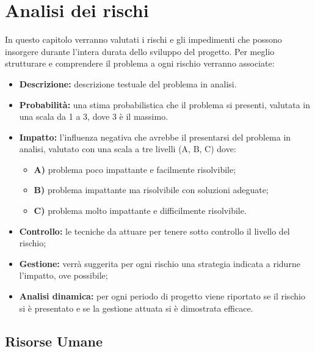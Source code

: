 \documentclass[a4paper,11pt]{article}
\begin{document}
	\section{Analisi dei rischi}
	In questo capitolo verranno valutati i rischi e gli impedimenti che possono insorgere durante l'intera durata dello sviluppo del progetto. Per meglio strutturare e comprendere il problema a ogni rischio verranno associate:
	\begin{itemize}
	\item \textbf{Descrizione:} descrizione testuale del problema in analisi.
	\item \textbf{Probabilità:} una stima probabilistica che il problema si presenti, valutata in una scala da 1 a 3, dove 3 è il massimo.
	\item \textbf{Impatto:} l'influenza negativa che avrebbe il presentarsi del problema in analisi, valutato con una scala a tre livelli (A, B, C) dove:
		\begin{itemize}
			\item \textbf{A)} problema poco impattante e facilmente risolvibile;
			\item \textbf{B)} problema impattante ma risolvibile con soluzioni adeguate;
			\item \textbf{C)} problema molto impattante e difficilmente risolvibile.
		\end{itemize}
	\item \textbf{Controllo:} le tecniche da attuare per tenere sotto controllo il livello del rischio;
	\item \textbf{Gestione:} verrà suggerita per ogni rischio una strategia indicata a ridurne l'impatto, ove possibile;
	\item \textbf{Analisi dinamica:} per ogni periodo di progetto viene riportato se il rischio si è presentato e se la gestione attuata si è dimostrata efficace. 
	\end{itemize}
	
	\subsection{Risorse Umane}
\end{document}
